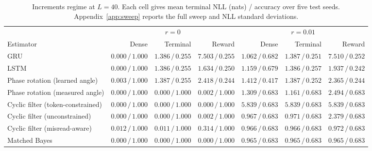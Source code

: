 \begin{table}[!htbp]
\centering\small
\caption{Increments regime at $L=40$. Each cell gives mean terminal
NLL (nats) / accuracy over five test seeds. Appendix~\ref{app:sweep}
reports the full sweep and NLL standard deviations.}
\label{tab:sweep}
\setlength{\tabcolsep}{3pt}
\begin{tabular}{@{}lrrrrrr@{}}
\toprule
& \multicolumn{3}{c}{$r=0$} & \multicolumn{3}{c}{$r=0.01$} \\
\cmidrule(lr){2-4}\cmidrule(l){5-7}
Estimator & Dense & Terminal & Reward & Dense & Terminal & Reward \\
\midrule
GRU & $0.000\,/\,1.000$ & $1.386\,/\,0.255$ & $7.503\,/\,0.255$ & $1.062\,/\,0.682$ & $1.387\,/\,0.251$ & $7.510\,/\,0.252$ \\
LSTM & $0.000\,/\,1.000$ & $1.386\,/\,0.255$ & $1.634\,/\,0.250$ & $1.159\,/\,0.679$ & $1.386\,/\,0.257$ & $1.937\,/\,0.242$ \\
Phase rotation (learned angle) & $0.003\,/\,1.000$ & $1.387\,/\,0.255$ & $2.418\,/\,0.244$ & $1.412\,/\,0.417$ & $1.387\,/\,0.252$ & $2.365\,/\,0.244$ \\
Phase rotation (measured angle) & $0.000\,/\,1.000$ & $0.000\,/\,1.000$ & $0.002\,/\,1.000$ & $1.309\,/\,0.683$ & $1.161\,/\,0.683$ & $2.494\,/\,0.683$ \\
Cyclic filter (token-constrained) & $0.000\,/\,1.000$ & $0.000\,/\,1.000$ & $0.000\,/\,1.000$ & $5.839\,/\,0.683$ & $5.839\,/\,0.683$ & $5.839\,/\,0.683$ \\
Cyclic filter (unconstrained) & $0.000\,/\,1.000$ & $0.000\,/\,1.000$ & $0.002\,/\,1.000$ & $0.967\,/\,0.683$ & $0.971\,/\,0.683$ & $2.379\,/\,0.683$ \\
Cyclic filter (misread-aware) & $0.012\,/\,1.000$ & $0.011\,/\,1.000$ & $0.314\,/\,1.000$ & $0.966\,/\,0.683$ & $0.966\,/\,0.683$ & $0.972\,/\,0.683$ \\
\midrule
Matched Bayes & $0.000\,/\,1.000$ & $0.000\,/\,1.000$ & $0.000\,/\,1.000$ & $0.965\,/\,0.683$ & $0.965\,/\,0.683$ & $0.965\,/\,0.683$ \\
\bottomrule
\end{tabular}
\end{table}
